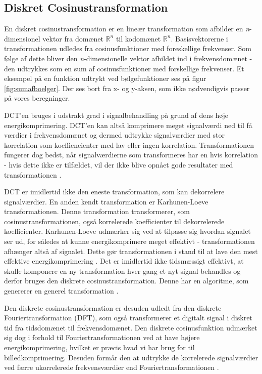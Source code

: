 \subsection{Diskret Cosinustransformation}\label{sec:DCT}
En diskret cosinustransformation er en lineær transformation som afbilder en \textit{n}-dimensionel vektor fra domænet $\mathbb{R}^n$ til kodomænet $\mathbb{R}^n$. Basisvektorerne i transformationen udledes fra cosinusfunktioner med foreskellige frekvenser. Som følge af dette bliver den \textit{n}-dimensionelle vektor afbildet ind i frekvensdomænet - den udtrykkes som en sum af cosinusfunktioner med forskellige frekvenser. Et eksempel på en funktion udtrykt ved bølgefunktioner ses på figur \vref{fig:sumafboelger}. Der ses bort fra x- og y-aksen, som ikke nødvendigvis passer på vores beregninger.

DCT'en bruges i udstrakt grad i signalbehandling på grund af dens høje energikomprimering. DCT'en kan altså komprimere meget signalværdi ned til få værdier i frekvensdomænet og dermed udtrykke signalværdier med stor korrelation som koeffiencienter med lav eller ingen korrelation. Transformationen fungerer dog bedst, når signalværdierne som transformeres har en hvis korrelation - hvis dette ikke er tilfældet, vil der ikke blive opnået gode resultater med transformationen \citep{smcnus_energy}.

DCT er imidlertid ikke den eneste transformation, som kan dekorrelere signalværdier. En anden kendt transformation er Karhunen-Loeve transformationen. Denne transformation transformerer, som cosinustransformationen, også korrelerede koefficienter til dekorrelerede koefficienter. Karhunen-Loeve udmærker sig ved at tilpasse sig hvordan signalet ser ud, for således at kunne energikomprimere meget effektivt - transformationen afhænger altså af signalet. Dette gør transformationen i stand til at lave den mest effektive energikomprimering \citep{lokminglui_DCT}. Det er imidlertid ikke tidsmæssigt effektivt, at skulle komponere en ny transformation hver gang et nyt signal behandles og derfor bruges den diskrete cosinustransformation. Denne har en algoritme, som genererer en generel transformation \citep{electronic_engineering}.

Den diskrete cosinustransformation er desuden udledt fra den diskrete Fouriertransformation (DFT), som også transformerer et digitalt signal i diskret tid fra tidsdomænet til frekvensdomænet. Den diskrete cosinusfunktion udmærket sig dog i forhold til Fouriertransformationen ved at have højere energikomprimering, hvilket er præcis hvad vi har brug for til billedkomprimering. Desuden formår den at udtrykke de korrelerede signalværdier ved færre ukorrelerede frekvensværdier end Fouriertransformationen \citep{smcnus_energy}.

